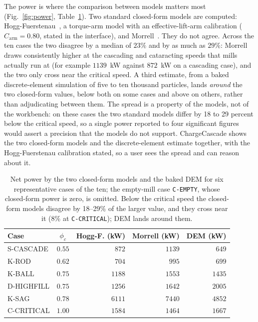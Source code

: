 \documentclass[journal]{IEEEtran}
\begin{document}
The power is where the comparison between models matters most (Fig.~\ref{fig:power}, Table~\ref{tab:power}).
Two standard closed-form models are computed: Hogg-Fuerstenau~\cite{hogg}, a torque-arm model with an
effective-lift-arm calibration ($C_{\text{arm}}=0.80$, stated in the interface), and Morrell~\cite{morrell}. They
do not agree. Across the ten cases the two disagree by a median of $23\%$ and by as much as $29\%$: Morrell draws
consistently higher at the cascading and cataracting speeds that mills actually run at (for example
$1139$~kW against $872$~kW on a cascading case), and the two only cross near the critical speed. A third estimate,
from a baked discrete-element simulation of five to ten thousand particles, lands \emph{around} the two closed-form
values, below both on some cases and above on others, rather than adjudicating between them. The spread is a
property of the models, not of the workbench: on these cases the two standard models differ by 18 to 29 percent
below the critical speed, so a single power reported to four significant figures would assert a precision that
the models do not support. ChargeCascade shows the two closed-form models and the discrete-element estimate together, with the
Hogg-Fuerstenau calibration stated, so a user sees the spread and can reason about it.

\begin{table}[!t]
\centering
\caption{Net power by the two closed-form models and the baked DEM for six representative cases of the ten; the
empty-mill case \texttt{C-EMPTY}, whose closed-form power is zero, is omitted. Below the critical speed the
closed-form models disagree by 18--29\% of the larger value, and they cross near it (8\% at \texttt{C-CRITICAL});
DEM lands around them.}
\label{tab:power}
\footnotesize
\begin{tabular}{@{}l c r r r@{}}
\toprule
Case & $\phi_c$ & Hogg-F. (kW) & Morrell (kW) & DEM (kW) \\
\midrule
S-CASCADE   & $0.55$ & $872$  & $1139$ & $649$  \\
K-ROD       & $0.62$ & $704$  & $995$  & $699$  \\
K-BALL      & $0.75$ & $1188$ & $1553$ & $1435$ \\
D-HIGHFILL  & $0.75$ & $1256$ & $1642$ & $2005$ \\
K-SAG       & $0.78$ & $6111$ & $7440$ & $4852$ \\
C-CRITICAL  & $1.00$ & $1584$ & $1464$ & $1667$ \\
\bottomrule
\end{tabular}
\end{table}
\end{document}
